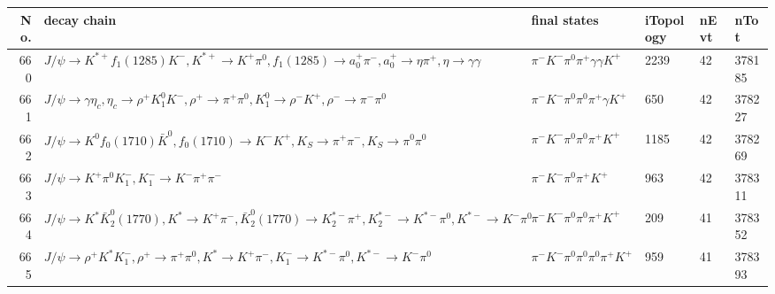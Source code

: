 \begin{table}[htbp] 
\begin{center}
\begin{small}
\begin{tabular}{rlllll}\hline\hline
 No. & decay chain & final states &  iTopology & nEvt & nTot \\\hline
660&$J/\psi       \rightarrow K^{*+}         f_{1}(1285)    K^{-}          , K^{*+}          \rightarrow K^{+}          \pi^{0}        , f_{1}(1285)     \rightarrow a_{0}^{+}      \pi^{-}        , a_{0}^{+}       \rightarrow \eta          \pi^{+}        , \eta           \rightarrow \gamma       \gamma       $&$\pi^{-}        K^{-}          \pi^{0}        \pi^{+}        \gamma       \gamma       K^{+}          $& 2239&   42&378185\\
661&$J/\psi       \rightarrow \gamma       \eta_{c}    , \eta_{c}     \rightarrow \rho^{+}      K_1^{0}        K^{-}          , \rho^{+}       \rightarrow \pi^{+}        \pi^{0}        , K_1^{0}         \rightarrow \rho^{-}      K^{+}          , \rho^{-}       \rightarrow \pi^{-}        \pi^{0}        $&$\pi^{-}        K^{-}          \pi^{0}        \pi^{0}        \pi^{+}        \gamma       K^{+}          $&  650&   42&378227\\
662&$J/\psi       \rightarrow K^{0}          f_{0}(1710)    \bar{K}^{0}   , f_{0}(1710)     \rightarrow K^{-}          K^{+}          , K_{S}           \rightarrow \pi^{+}        \pi^{-}        , K_{S}           \rightarrow \pi^{0}        \pi^{0}        $&$\pi^{-}        K^{-}          \pi^{0}        \pi^{0}        \pi^{+}        K^{+}          $& 1185&   42&378269\\
663&$J/\psi       \rightarrow K^{+}          \pi^{0}        K_{1}^{-}      , K_{1}^{-}       \rightarrow K^{-}          \pi^{+}        \pi^{-}        $&$\pi^{-}        K^{-}          \pi^{0}        \pi^{+}        K^{+}          $&  963&   42&378311\\
664&$J/\psi       \rightarrow K^{*}          \bar{K}_2^0(1770), K^{*}           \rightarrow K^{+}          \pi^{-}        , \bar{K}_2^0(1770) \rightarrow K_2^{*-}       \pi^{+}        , K_2^{*-}        \rightarrow K^{*-}         \pi^{0}        , K^{*-}          \rightarrow K^{-}          \pi^{0}        $&$\pi^{-}        K^{-}          \pi^{0}        \pi^{0}        \pi^{+}        K^{+}          $&  209&   41&378352\\
665&$J/\psi       \rightarrow \rho^{+}      K^{*}          K_{1}^{-}      , \rho^{+}       \rightarrow \pi^{+}        \pi^{0}        , K^{*}           \rightarrow K^{+}          \pi^{-}        , K_{1}^{-}       \rightarrow K^{*-}         \pi^{0}        , K^{*-}          \rightarrow K^{-}          \pi^{0}        $&$\pi^{-}        K^{-}          \pi^{0}        \pi^{0}        \pi^{0}        \pi^{+}        K^{+}          $&  959&   41&378393\\

\end{tabular}
\end{small}
\end{center}
\end{table}

